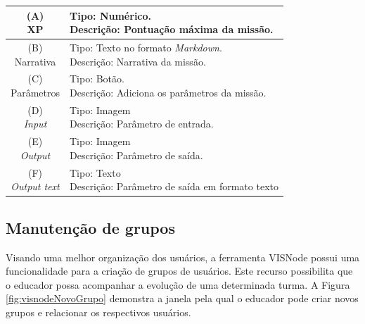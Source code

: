 \documentclass[
	12pt,				%
	oneside,			%
	a4paper,			%
	english,			%
	french,				%
	spanish,			%
	brazil,				%
	]{abntex2}
\begin{document}
\begin{table}[H]
\centering
{} \label{tab:manutencaoMissoes}
\renewcommand{\arraystretch}{1.8}
\setlength{\tabcolsep}{10pt}
\begin{tabular}{|c|l|}
  \hline
  \makecell{(A) \\ XP} 
  &
  \makecell[l]{Tipo: Numérico.\\ Descrição: Pontuação máxima da missão.} \\
  \hline
  \makecell{(B) \\ Narrativa} 
  &
  \makecell[l]{Tipo: Texto no formato \textit{Markdown}.\\ Descrição: Narrativa da missão.} \\
  \hline
  \makecell{(C) \\ Parâmetros} 
  &
  \makecell[l]{Tipo: Botão. \\ Descrição: Adiciona os parâmetros da missão.} \\
  \hline
  \makecell{(D) \\ \textit{Input}} 
  &
  \makecell[l]{Tipo: Imagem\\ Descrição: Parâmetro de entrada.} \\
  \hline
  \makecell{(E) \\ \textit{Output}} 
  &
  \makecell[l]{Tipo: Imagem\\ Descrição: Parâmetro de saída.} \\
  \hline  
  \makecell{(F) \\ \textit{Output text}} 
  &
  \makecell[l]{Tipo: Texto \\ Descrição: Parâmetro de saída em formato texto} \\
  \hline    
\end{tabular}
\centering
\sourceAuthor
\end{table}



\subsection{Manutenção de grupos}

Visando uma melhor organização dos usuários, a ferramenta VISNode possui uma funcionalidade para a criação de grupos de usuários. Este recurso possibilita que o educador possa acompanhar a evolução de uma determinada turma. A Figura \ref{fig:visnodeNovoGrupo} demonstra a janela pela qual o educador pode criar novos grupos e relacionar os respectivos usuários.
\end{document}
